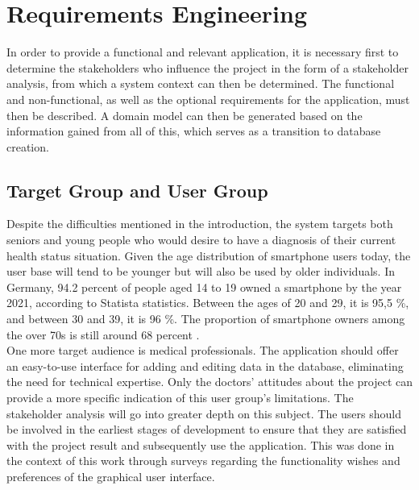 
\chapter{Requirements Engineering}
In order to provide a functional and relevant application, it is necessary first to determine the stakeholders who influence the project in the form of a stakeholder analysis, from which a system context can then be determined. The functional and non-functional, as well as the optional requirements for the application, must then be described. A domain model can then be generated based on the information gained from all of this, which serves as a transition to database creation.

\section{Target Group and User Group}
Despite the difficulties mentioned in the introduction, the system targets both seniors and young people who would desire to have a diagnosis of their current health status situation. Given the age distribution of smartphone users today, the user base will tend to be younger but will also be used by older individuals. In Germany, 94.2 percent of people aged 14 to 19 owned a smartphone by the year 2021, according to Statista statistics. Between the ages of 20 and 29, it is 95,5 \%, and between 30 and 39, it is 96 \%. The proportion of smartphone owners among the over 70s is still around 68 percent \cite{.smartphonenutzer}.
\newline \\
One more target audience is medical professionals. The application should offer an easy-to-use interface for adding and editing data in the database, eliminating the need for technical expertise. Only the doctors' attitudes about the project can provide a more specific indication of this user group's limitations. The stakeholder analysis will go into greater depth on this subject. The users should be involved in the earliest stages of development to ensure that they are satisfied with the project result and subsequently use the application. This was done in the context of this work through surveys regarding the functionality wishes and preferences of the graphical user interface.


